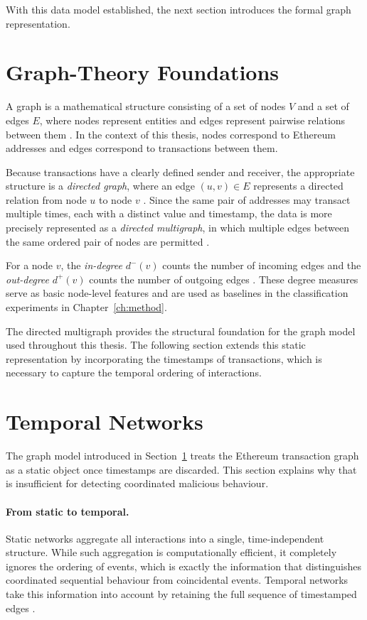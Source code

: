 \documentclass{thesisclass}
\begin{document}
With this data model established, the next section introduces the formal graph representation.

\section{Graph-Theory Foundations}
\label{sec:graph}

A graph is a mathematical structure consisting of a set of nodes $V$ and a set 
of edges $E$, where nodes represent entities and edges represent pairwise 
relations between them \citep{newman2010networks}. In the context of this
thesis, nodes correspond to Ethereum addresses and edges correspond to 
transactions between them.

Because transactions have a clearly defined sender and receiver, the 
appropriate structure is a \emph{directed graph}, where an edge $(u, v) \in E$ 
represents a directed relation from node $u$ to node $v$ 
\citep{newman2010networks}. Since the same pair of addresses may transact
multiple times, each with a distinct value and timestamp, the data is more 
precisely represented as a \emph{directed multigraph}, in which multiple edges 
between the same ordered pair of nodes are permitted 
\citep{paranjape2017motifs, sanjalawe2023atd}.

For a node $v$, the \emph{in-degree} $d^-(v)$ counts the number of incoming 
edges and the \emph{out-degree} $d^+(v)$ counts the number of outgoing edges 
\citep{newman2010networks}. These degree measures serve as basic node-level
features and are used as baselines in the classification experiments in 
Chapter~\ref{ch:method}.

The directed multigraph provides the structural foundation for the graph model 
used throughout this thesis. The following section extends this static 
representation by incorporating the timestamps of transactions, which is 
necessary to capture the temporal ordering of interactions.


\section{Temporal Networks}
\label{sec:temporal_networks}
The graph model introduced in Section~\ref{sec:graph} treats the Ethereum transaction graph as a static object once timestamps are discarded. This section explains why that is insufficient for detecting coordinated malicious behaviour.

\paragraph{From static to temporal.}
Static networks aggregate all interactions into a single, time-independent structure. While such aggregation is computationally efficient, it completely ignores the ordering of events, which is exactly the information that distinguishes coordinated sequential behaviour from coincidental events. Temporal networks take this information into account by retaining the full sequence of timestamped edges \citep{kovanen2011temporal, paranjape2017motifs}.
\end{document}
